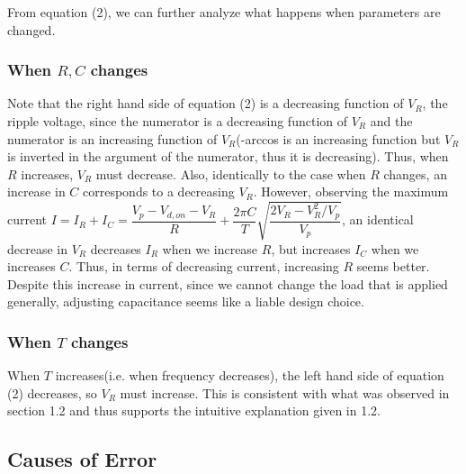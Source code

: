\documentclass[a4paper, itemph]{oblivoir}
\theoremstyle{definition}
\begin{document}
From equation (2), we can further analyze what happens when parameters are changed.
\subsubsection{When $R, C$ changes}
Note that the right hand side of equation (2) is a decreasing function of $V_R$, the ripple voltage, since the numerator is a decreasing function of $V_R$ and the numerator is an increasing function of $V_R$(-arccos is an increasing function but $V_R$ is inverted in the argument of the numerator, thus it is decreasing). Thus, when $R$ increases, $V_R$ must decrease. Also, identically to the case when $R$ changes, an increase in $C$ corresponds to a decreasing $V_R$. However, observing the maximum current $I=I_R+I_C=\dfrac{V_p-V_{d,on}-V_R}{R}+\dfrac{2\pi C}{T}\sqrt{\dfrac{2V_R-V_R^2/V_p}{V_p}}$, an identical decrease in $V_R$ decreases $I_R$ when we increase $R$, but increases $I_C$ when we increases $C$. Thus, in terms of decreasing current, increasing $R$ seems better. Despite this increase in current, since we cannot change the load that is applied generally, adjusting capacitance seems like a liable design choice.
\subsubsection{When $T$ changes}
When $T$ increases(i.e. when frequency decreases), the left hand side of equation (2) decreases, so $V_R$ must increase. This is consistent with what was observed in section 1.2 and thus supports the intuitive explanation given in 1.2.
\subsection{Causes of Error}
\end{document}
